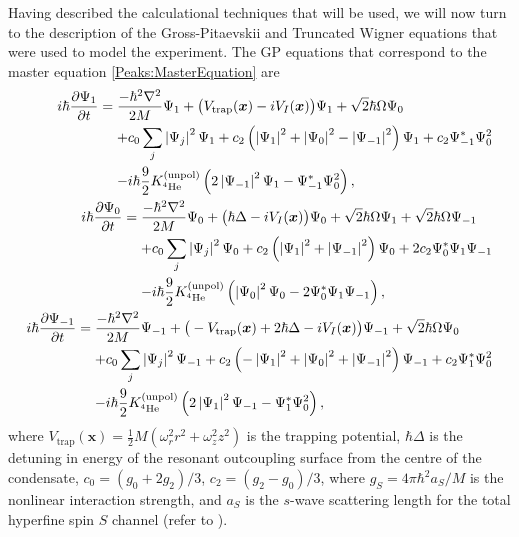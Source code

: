 Having described the calculational techniques that will be used, we will now turn to the description of the Gross-Pitaevskii and Truncated Wigner equations that were used to model the experiment. The GP equations that correspond to the master equation \eqref{Peaks:MasterEquation} are
\begin{subequations}
    \label{Peaks:3DGPEquations}
    \begin{align}
        \begin{split}
            i \hbar \frac{\partial \Psi_1}{\partial t} &= \frac{-\hbar^2 \nabla^2}{2 M} \Psi_1 + \big(V_\text{trap}(\bm{x}) - i V_I(\bm{x})\big)\Psi_1 + \sqrt{2} \hbar \Omega \Psi_0 \\
            & \relphantom{=} + c_0 \sum_j \abs{\Psi_j}^2 \Psi_1 + c_2\left(\abs{\Psi_1}^2 + \abs{\Psi_0}^2 - \abs{\Psi_{-1}}^2 \right) \Psi_1 + c_2 \Psi_{-1}^*\Psi_0^2 \\
            & \relphantom{=} - i \hbar\frac{9}{2}K^\text{(unpol)}_{^{4}\text{He}} \left(2\abs{\Psi_{-1}}^2 \Psi_1 - \Psi_{-1}^* \Psi_0^2\right),
        \end{split}\\
        \begin{split}
            i \hbar \frac{\partial \Psi_0}{\partial t} &= \frac{-\hbar^2 \nabla^2}{2 M} \Psi_0 + \big(\hbar \Delta - i V_I(\bm{x}) \big)\Psi_0 + \sqrt{2} \hbar \Omega \Psi_1 + \sqrt{2}\hbar\Omega \Psi_{-1} \\
            & \relphantom{=} + c_0 \sum_j \abs{\Psi_j}^2 \Psi_0 + c_2\left(\abs{\Psi_1}^2 + \abs{\Psi_{-1}}^2 \right) \Psi_0 + 2 c_2 \Psi_{0}^*\Psi_1\Psi_{-1} \\
            & \relphantom{=} - i \hbar\frac{9}{2}K^\text{(unpol)}_{^{4}\text{He}} \left(\abs{\Psi_{0}}^2 \Psi_0 - 2\Psi_{0}^* \Psi_1\Psi_{-1}\right),
        \end{split}\\
        \begin{split}
            i \hbar \frac{\partial \Psi_{-1}}{\partial t} &= \frac{-\hbar^2 \nabla^2}{2 M} \Psi_{-1} + \big(-V_\text{trap}(\bm{x}) + 2 \hbar \Delta - i V_I(\bm{x})\big)\Psi_{-1} + \sqrt{2} \hbar \Omega \Psi_0 \\
            & \relphantom{=} + c_0 \sum_j \abs{\Psi_j}^2 \Psi_{-1} + c_2\left(-\abs{\Psi_1}^2 + \abs{\Psi_0}^2 + \abs{\Psi_{-1}}^2 \right) \Psi_{-1} + c_2 \Psi_{1}^*\Psi_0^2 \\
            & \relphantom{=} - i \hbar\frac{9}{2}K^\text{(unpol)}_{^{4}\text{He}} \left(2\abs{\Psi_{1}}^2 \Psi_{-1} - \Psi_{1}^* \Psi_0^2\right),
        \end{split}
    \end{align}
\end{subequations}
where $\displaystyle V_\text{trap}(\bm{x}) = \frac{1}{2} M \left(\omega_r^2 r^2 + \omega_z^2 z^2 \right)$ is the trapping potential, $\hbar \Delta$ is the detuning in energy of the resonant outcoupling surface from the centre of the condensate, $c_0 = (g_0 + 2 g_2)/3$, $c_2 = (g_2 - g_0)/3$, where $g_S = 4 \pi \hbar^2 a_S/M$ is the nonlinear interaction strength, and $a_S$ is the $s$-wave scattering length for the total hyperfine spin $S$ channel (refer to ).

